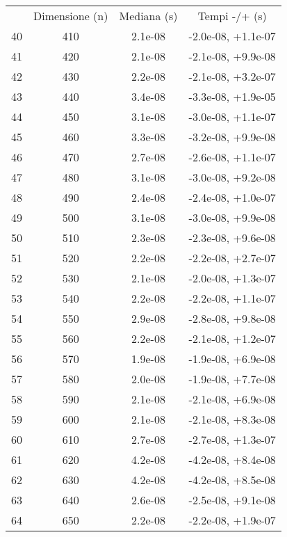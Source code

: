 \begin{table}
\centering
\begin{adjustbox}{width=1\textwidth/2}
\begin{tabular}{|c|c|c|c|}
\hline
 & Dimensione (n) & Mediana (s) & Tempi -/+ (s) \\
40 & 410 & 2.1e-08 & -2.0e-08, +1.1e-07 \\
\cline{1-4}
41 & 420 & 2.1e-08 & -2.1e-08, +9.9e-08 \\
\cline{1-4}
42 & 430 & 2.2e-08 & -2.1e-08, +3.2e-07 \\
\cline{1-4}
43 & 440 & 3.4e-08 & -3.3e-08, +1.9e-05 \\
\cline{1-4}
44 & 450 & 3.1e-08 & -3.0e-08, +1.1e-07 \\
\cline{1-4}
45 & 460 & 3.3e-08 & -3.2e-08, +9.9e-08 \\
\cline{1-4}
46 & 470 & 2.7e-08 & -2.6e-08, +1.1e-07 \\
\cline{1-4}
47 & 480 & 3.1e-08 & -3.0e-08, +9.2e-08 \\
\cline{1-4}
48 & 490 & 2.4e-08 & -2.4e-08, +1.0e-07 \\
\cline{1-4}
49 & 500 & 3.1e-08 & -3.0e-08, +9.9e-08 \\
\cline{1-4}
50 & 510 & 2.3e-08 & -2.3e-08, +9.6e-08 \\
\cline{1-4}
51 & 520 & 2.2e-08 & -2.2e-08, +2.7e-07 \\
\cline{1-4}
52 & 530 & 2.1e-08 & -2.0e-08, +1.3e-07 \\
\cline{1-4}
53 & 540 & 2.2e-08 & -2.2e-08, +1.1e-07 \\
\cline{1-4}
54 & 550 & 2.9e-08 & -2.8e-08, +9.8e-08 \\
\cline{1-4}
55 & 560 & 2.2e-08 & -2.1e-08, +1.2e-07 \\
\cline{1-4}
56 & 570 & 1.9e-08 & -1.9e-08, +6.9e-08 \\
\cline{1-4}
57 & 580 & 2.0e-08 & -1.9e-08, +7.7e-08 \\
\cline{1-4}
58 & 590 & 2.1e-08 & -2.1e-08, +6.9e-08 \\
\cline{1-4}
59 & 600 & 2.1e-08 & -2.1e-08, +8.3e-08 \\
\cline{1-4}
60 & 610 & 2.7e-08 & -2.7e-08, +1.3e-07 \\
\cline{1-4}
61 & 620 & 4.2e-08 & -4.2e-08, +8.4e-08 \\
\cline{1-4}
62 & 630 & 4.2e-08 & -4.2e-08, +8.5e-08 \\
\cline{1-4}
63 & 640 & 2.6e-08 & -2.5e-08, +9.1e-08 \\
\cline{1-4}
64 & 650 & 2.2e-08 & -2.2e-08, +1.9e-07 \\

\end{tabular}
\end{adjustbox}
\end{table}
